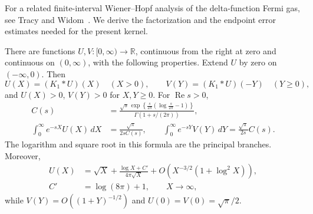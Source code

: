 For a related finite-interval Wiener--Hopf analysis of the delta-function
Fermi gas, see Tracy and Widom~\cite{TracyWidom2016}.  We derive the
factorization and the endpoint error estimates needed for the present
kernel.

\begin{lemma}\label{brownian:halfline}
There are functions $U,V:[0,\infty)\to\mathbb R$, continuous from the
right at zero and continuous on $(0,\infty)$, with the following
properties.  Extend $U$ by zero on $(-\infty,0)$.  Then
\[
 U(X)=(K_1*U)(X)\quad(X>0),
 \qquad V(Y)=(K_1*U)(-Y)\quad(Y\ge0),
\]
and $U(X)>0$, $V(Y)>0$ for $X,Y\ge0$.  For $\operatorname{Re}s>0$,
\begin{equation}\label{eq:B7}
\begin{split}
 C(s)&=\frac{\sqrt{s}\,
  \exp\!\left\{\frac{s}{2\pi}
             \left(\log\frac{s}{2\pi}-1\right)\right\}}
 {\Gamma(1+s/(2\pi))},\\
 \int_0^\infty e^{-sX}U(X)\,dX
   &=\frac{\sqrt\pi}{2sC(s)},\qquad
 \int_0^\infty e^{-sY}V(Y)\,dY
   =\frac{\sqrt\pi}{2s}C(s).
\end{split}
\end{equation}
The logarithm and square root in this formula are the principal branches.
Moreover,
\begin{equation}\label{brownian:U-asymptotic}
\begin{aligned}
 U(X)&=\sqrt X+
       \frac{\log X+C'}{4\pi\sqrt X}
       +O\!\left(X^{-3/2}(1+\log^2X)\right),\\
 C'&=\log(8\pi)+1,\qquad X\longrightarrow\infty,
\end{aligned}
\end{equation}
while $V(Y)=O((1+Y)^{-1/2})$ and
$U(0)=V(0)=\sqrt\pi/2$.
\end{lemma}

